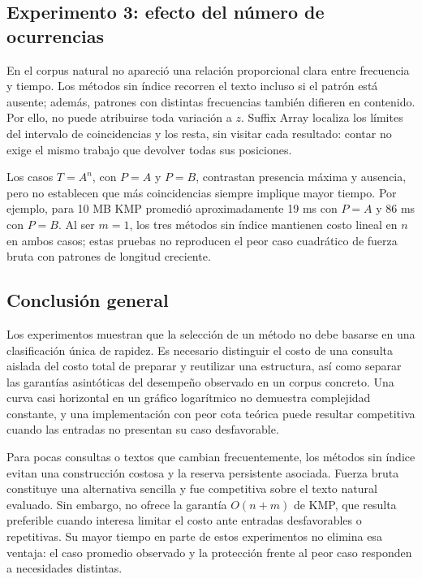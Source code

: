 \subsection{Experimento 3: efecto del número de ocurrencias}

En el corpus natural no apareció una relación proporcional clara entre
frecuencia y tiempo. Los métodos sin índice recorren el texto incluso si
el patrón está ausente; además, patrones con distintas frecuencias también
difieren en contenido. Por ello, no puede atribuirse toda variación a
\(z\). Suffix Array localiza los límites del intervalo de coincidencias y
los resta, sin visitar cada resultado: contar no exige el mismo trabajo
que devolver todas sus posiciones.

Los casos \(T=A^n\), con \(P=A\) y \(P=B\), contrastan presencia máxima y
ausencia, pero no establecen que más coincidencias siempre implique mayor
tiempo. Por ejemplo, para 10 MB KMP promedió aproximadamente 19 ms con
\(P=A\) y 86 ms con \(P=B\). Al ser \(m=1\), los tres métodos sin índice
mantienen costo lineal en \(n\) en ambos casos; estas pruebas no reproducen
el peor caso cuadrático de fuerza bruta con patrones de longitud creciente.

\clearpage
\subsection{Conclusión general}

Los experimentos muestran que la selección de un método no debe basarse en
una clasificación única de rapidez. Es necesario distinguir el costo de
una consulta aislada del costo total de preparar y reutilizar una
estructura, así como separar las garantías asintóticas del desempeño
observado en un corpus concreto. Una curva casi horizontal en un gráfico
logarítmico no demuestra complejidad constante, y una implementación con
peor cota teórica puede resultar competitiva cuando las entradas no
presentan su caso desfavorable.

Para pocas consultas o textos que cambian frecuentemente, los métodos sin
índice evitan una construcción costosa y la reserva persistente asociada.
Fuerza bruta constituye una alternativa sencilla y fue competitiva sobre
el texto natural evaluado. Sin embargo, no ofrece la garantía
\(O(n+m)\) de KMP, que resulta preferible cuando interesa limitar el costo
ante entradas desfavorables o repetitivas. Su mayor tiempo en parte de
estos experimentos no elimina esa ventaja: el caso promedio observado y
la protección frente al peor caso responden a necesidades distintas.

